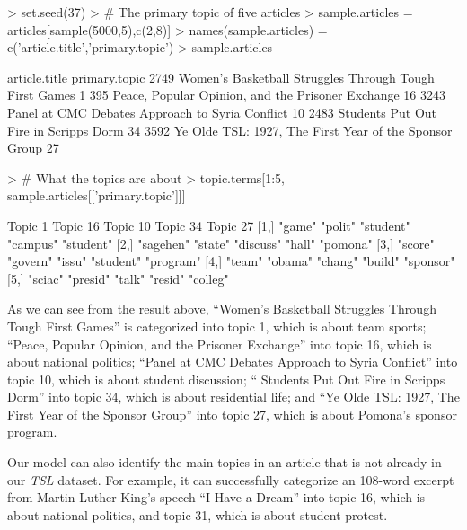 \documentclass[a4paper]{article}
\begin{document}
\begin{Schunk}
\begin{Sinput}
> set.seed(37)
> # The primary topic of five articles
> sample.articles = articles[sample(5000,5),c(2,8)]
> names(sample.articles) = c('article.title','primary.topic')
> sample.articles
\end{Sinput}
\begin{Soutput}
                                              article.title primary.topic
2749 Women's Basketball Struggles Through Tough First Games             1
395       Peace, Popular Opinion, and the Prisoner Exchange            16
3243        Panel at CMC Debates Approach to Syria Conflict            10
2483                  Students Put Out Fire in Scripps Dorm            34
3592 Ye Olde TSL: 1927, The First Year of the Sponsor Group            27
\end{Soutput}
\begin{Sinput}
> # What the topics are about
> topic.terms[1:5, sample.articles[['primary.topic']]]
\end{Sinput}
\begin{Soutput}
     Topic 1   Topic 16 Topic 10  Topic 34  Topic 27 
[1,] "game"    "polit"  "student" "campus"  "student"
[2,] "sagehen" "state"  "discuss" "hall"    "pomona" 
[3,] "score"   "govern" "issu"    "student" "program"
[4,] "team"    "obama"  "chang"   "build"   "sponsor"
[5,] "sciac"   "presid" "talk"    "resid"   "colleg" 
\end{Soutput}
\end{Schunk}

As we can see from the result above, ``Women's Basketball Struggles Through Tough First Games'' is categorized into topic 1, which is about team sports; ``Peace, Popular Opinion, and the Prisoner Exchange'' into topic 16, which is about national politics; ``Panel at CMC Debates Approach to Syria Conflict'' into topic 10, which is about student discussion; `` Students Put Out Fire in Scripps Dorm'' into topic 34, which is about residential life; and ``Ye Olde TSL: 1927, The First Year of the Sponsor Group'' into topic 27, which is about Pomona's sponsor program. 

Our model can also identify the main topics in an article that is not already in our \textit{TSL} dataset. For example, it can successfully categorize an 108-word excerpt from Martin Luther King's speech ``I Have a Dream'' into topic 16, which is about national politics, and topic 31, which is about student protest.
\end{document}
